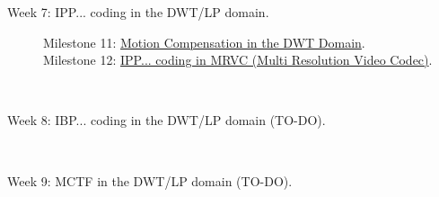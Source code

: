 \begin{description}
\item [Week 7: {\normalfont IPP... coding in the DWT/LP domain.}]
  \begin{description}
  \item [Milestone 11: {\normalfont \href{https://sistemas-multimedia.github.io/milestones/11-MC_in_DWT_domain/}{Motion Compensation in the DWT Domain}.}]
  \item [Milestone 12: {\normalfont \href{https://sistemas-multimedia.github.io/milestones/12-IPP_coding/}{IPP... coding in MRVC (Multi Resolution Video Codec)}.}]
  \end{description}
  ~\newline
\item [Week 8: {\normalfont IBP... coding in the DWT/LP domain (TO-DO).}]
  ~\newline
\item [Week 9: {\normalfont MCTF in the DWT/LP domain (TO-DO).}]
\end{description}

